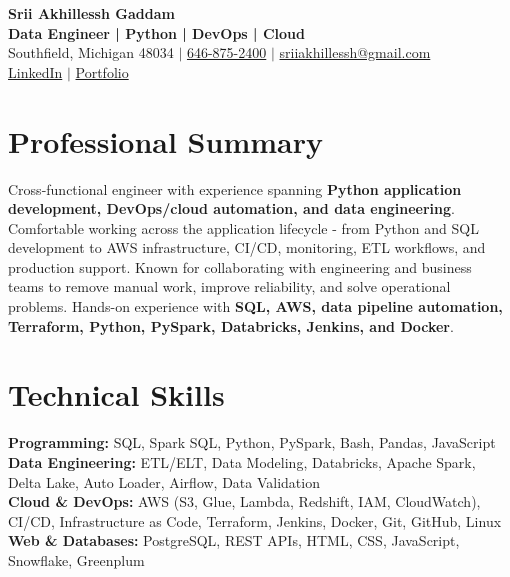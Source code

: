 \documentclass[letterpaper,10pt]{article}
\begin{document}
\fontsize{9.35pt}{10.45pt}\selectfont

\begin{center}
    {\LARGE \textbf{Srii Akhillessh Gaddam}} \\[-1pt]
    \textbf{Data Engineer | Python | DevOps | Cloud} \\[2pt]
    Southfield, Michigan 48034 $|$
    \href{tel:6468752400}{646-875-2400} $|$
    \href{mailto:sriiakhillessh@gmail.com}{sriiakhillessh@gmail.com} \\[1pt]
    \href{https://www.linkedin.com/in/srii-akhiilessh-gaddam-b48668191/}{LinkedIn} $|$
    \href{https://sriiakhillesshg.github.io/portfolio/}{Portfolio}
\end{center}
\vspace{-8pt}

\section{Professional Summary}
\small{Cross-functional engineer with experience spanning \textbf{Python application development, DevOps/cloud automation, and data engineering}. Comfortable working across the application lifecycle - from Python and SQL development to AWS infrastructure, CI/CD, monitoring, ETL workflows, and production support. Known for collaborating with engineering and business teams to remove manual work, improve reliability, and solve operational problems. Hands-on experience with \textbf{SQL, AWS, data pipeline automation, Terraform, Python, PySpark, Databricks, Jenkins, and Docker}.}

\section{Technical Skills}
\small{
\textbf{Programming:} SQL, Spark SQL, Python, PySpark, Bash, Pandas, JavaScript \\
\textbf{Data Engineering:} ETL/ELT, Data Modeling, Databricks, Apache Spark, Delta Lake, Auto Loader, Airflow, Data Validation \\
\textbf{Cloud \& DevOps:} AWS (S3, Glue, Lambda, Redshift, IAM, CloudWatch), CI/CD, Infrastructure as Code, Terraform, Jenkins, Docker, Git, GitHub, Linux \\
\textbf{Web \& Databases:} PostgreSQL, REST APIs, HTML, CSS, JavaScript, Snowflake, Greenplum
}
\end{document}
